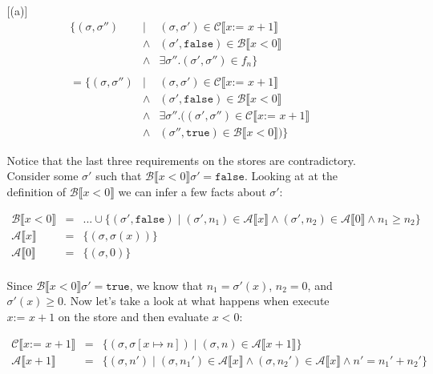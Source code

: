 \documentclass[10pt, oneside]{article}
\begin{document}
\begin{enumerate}[1.]
\begin{enumerate} [(a)]
			\begin{eqnarray*}
			  \{ (\sigma, \sigma'') & \mid & (\sigma, \sigma')  \in \mathcal{C} \llbracket x \texttt{:= } x + 1 \rrbracket \\ 
			  & \wedge & (\sigma', \texttt{false})\in \mathcal{B} \llbracket x < 0 \rrbracket \\
				& \wedge & \exists \sigma''. (\sigma', \sigma'') \in f_n \} \\
				& & \\
				= \{ (\sigma, \sigma'') & \mid & (\sigma, \sigma')  \in \mathcal{C} \llbracket x \texttt{:= } x + 1 \rrbracket \\ 
			  & \wedge & (\sigma', \texttt{false})\in \mathcal{B} \llbracket x < 0 \rrbracket \\
				& \wedge & \exists \sigma''. ((\sigma', \sigma'') \in \mathcal{C} \llbracket x \texttt{:= } x + 1 \rrbracket \\
				& \wedge & (\sigma'', \texttt{true}) \in \mathcal{B} \llbracket x < 0 \rrbracket) \}
			\end{eqnarray*}
			
			Notice that the last three requirements on the stores are contradictory. 
			Consider some $\sigma'$ such that $\mathcal{B} \llbracket x < 0 \rrbracket 
			\sigma' = \texttt{false}$.  Looking at at the definition of 
			$\mathcal{B} \llbracket x < 0 \rrbracket$ we can infer a few facts about 
			$\sigma'$:
			
			\begin{eqnarray*}
			  \mathcal{B} \llbracket x < 0 \rrbracket & = & ... \cup \{ (\sigma', \texttt{false}) \mid (\sigma', n_1) \in \mathcal{A} \llbracket x \rrbracket \wedge (\sigma', n_2) \in \mathcal{A} \llbracket 0 \rrbracket \wedge n_1 \geq n_2 \} \\
			  \mathcal{A} \llbracket x \rrbracket & = & \{(\sigma, \sigma(x))\} \\
			  \mathcal{A} \llbracket 0 \rrbracket & = & \{(\sigma, 0)\} \\
			\end{eqnarray*}
			
			Since $\mathcal{B} \llbracket x < 0 \rrbracket \sigma' = \texttt{true}$, we
			know that $n_1 = \sigma'(x)$, $n_2 = 0$, and $\sigma'(x) \geq 0$. Now let's 
			take a look at what happens when execute $x \texttt{:= } x + 1$ on the 
			store and then evaluate $x < 0$:
			
			\begin{eqnarray*}
			  \mathcal{C} \llbracket x \texttt{:= } x + 1 \rrbracket & = & \{ (\sigma, \sigma[x \mapsto n]) \mid (\sigma, n) \in \mathcal{A} \llbracket x + 1 \rrbracket \} \\
			  \mathcal{A} \llbracket x + 1 \rrbracket & = & \{(\sigma, n') \mid (\sigma, n_1') \in \mathcal{A} \llbracket x \rrbracket \wedge (\sigma, n_2') \in \mathcal{A} \llbracket x \rrbracket \wedge n' = n_1' + n_2' \}
			\end{eqnarray*}
			

\end{enumerate}
\end{enumerate}
\end{document}
